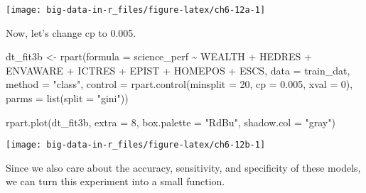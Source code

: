 \documentclass[
]{book}
\newenvironment{Shaded}{\begin{snugshade}}{\end{snugshade}}
\newcommand{\AttributeTok}[1]{\textcolor[rgb]{0.77,0.63,0.00}{#1}}
\newcommand{\DecValTok}[1]{\textcolor[rgb]{0.00,0.00,0.81}{#1}}
\newcommand{\FloatTok}[1]{\textcolor[rgb]{0.00,0.00,0.81}{#1}}
\newcommand{\FunctionTok}[1]{\textcolor[rgb]{0.00,0.00,0.00}{#1}}
\newcommand{\NormalTok}[1]{#1}
\newcommand{\OtherTok}[1]{\textcolor[rgb]{0.56,0.35,0.01}{#1}}
\newcommand{\SpecialCharTok}[1]{\textcolor[rgb]{0.00,0.00,0.00}{#1}}
\newcommand{\StringTok}[1]{\textcolor[rgb]{0.31,0.60,0.02}{#1}}
\begin{document}
\texttt{[image: big-data-in-r\_files/figure-latex/ch6-12a-1]}

Now, let's change cp to 0.005.

\begin{Shaded}
\begin{Highlighting}[]
\NormalTok{dt\_fit3b }\OtherTok{\textless{}{-}} \FunctionTok{rpart}\NormalTok{(}\AttributeTok{formula =}\NormalTok{ science\_perf }\SpecialCharTok{\textasciitilde{}}\NormalTok{ WEALTH }\SpecialCharTok{+}\NormalTok{ HEDRES }\SpecialCharTok{+}\NormalTok{ ENVAWARE }\SpecialCharTok{+}\NormalTok{ ICTRES }\SpecialCharTok{+}\NormalTok{ EPIST }\SpecialCharTok{+} 
\NormalTok{                   HOMEPOS }\SpecialCharTok{+}\NormalTok{ ESCS,}
                 \AttributeTok{data =}\NormalTok{ train\_dat,}
                 \AttributeTok{method =} \StringTok{"class"}\NormalTok{, }
                 \AttributeTok{control =} \FunctionTok{rpart.control}\NormalTok{(}\AttributeTok{minsplit =} \DecValTok{20}\NormalTok{, }
                                         \AttributeTok{cp =} \FloatTok{0.005}\NormalTok{, }
                                         \AttributeTok{xval =} \DecValTok{0}\NormalTok{),}
                \AttributeTok{parms =} \FunctionTok{list}\NormalTok{(}\AttributeTok{split =} \StringTok{"gini"}\NormalTok{))}

\FunctionTok{rpart.plot}\NormalTok{(dt\_fit3b, }\AttributeTok{extra =} \DecValTok{8}\NormalTok{, }\AttributeTok{box.palette =} \StringTok{"RdBu"}\NormalTok{, }\AttributeTok{shadow.col =} \StringTok{"gray"}\NormalTok{)}
\end{Highlighting}
\end{Shaded}

\texttt{[image: big-data-in-r\_files/figure-latex/ch6-12b-1]}

Since we also care about the accuracy, sensitivity, and specificity of these models, we can turn this experiment into a small function.
\end{document}
